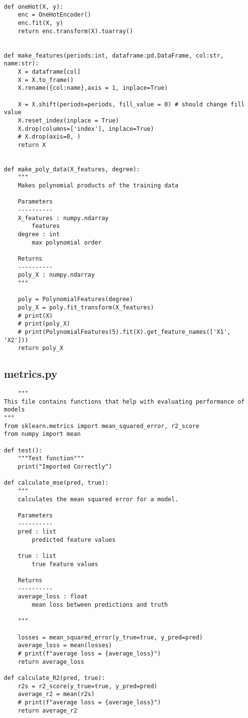 \begin{verbatim}
    
def oneHot(X, y):
    enc = OneHotEncoder()
    enc.fit(X, y)
    return enc.transform(X).toarray()


def make_features(periods:int, dataframe:pd.DataFrame, col:str, name:str):
    X = dataframe[col]
    X = X.to_frame()
    X.rename({col:name},axis = 1, inplace=True)

    X = X.shift(periods=periods, fill_value = 0) # should change fill value
    X.reset_index(inplace = True)
    X.drop(columns=['index'], inplace=True)
    # X.drop(axis=0, )
    return X


def make_poly_data(X_features, degree):
    """
    Makes polynomial products of the training data

    Parameters
    ----------
    X_features : numpy.ndarray
        features
    degree : int
        max polynomial order
        
    Returns
    ----------
    poly_X : numpy.ndarray
    """

    poly = PolynomialFeatures(degree)
    poly_X = poly.fit_transform(X_features)
    # print(X)
    # print(poly_X)
    # print(PolynomialFeatures(5).fit(X).get_feature_names(['X1', 'X2']))
    return poly_X
\end{verbatim}

\subsection{metrics.py}
\begin{verbatim}
    """
This file contains functions that help with evaluating performance of models
"""
from sklearn.metrics import mean_squared_error, r2_score
from numpy import mean

def test():
    """Test function"""
    print("Imported Correctly")

def calculate_mse(pred, true):
    """
    calculates the mean squared error for a model.

    Parameters
    ----------
    pred : list 
        predicted feature values

    true : list 
        true feature values

    Returns
    ----------
    average_loss : float
        mean loss between predictions and truth

    """

    losses = mean_squared_error(y_true=true, y_pred=pred)
    average_loss = mean(losses)
    # print(f"average loss = {average_loss}")
    return average_loss

def calculate_R2(pred, true):
    r2s = r2_score(y_true=true, y_pred=pred)
    average_r2 = mean(r2s)
    # print(f"average loss = {average_loss}")
    return average_r2

\end{verbatim}